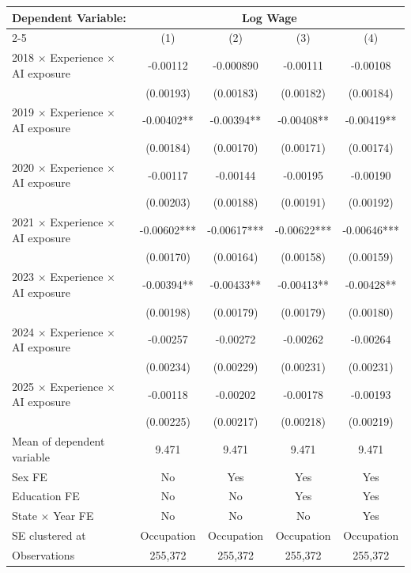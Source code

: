 \def\sym#1{\ifmmode^{#1}\else\(^{#1}\)\fi}
\begin{tabular}{l*{4}{c}}
\toprule
Dependent Variable: & \multicolumn{4}{c}{Log Wage} \\
\cmidrule(lr){2-5}
 & (1) & (2) & (3) & (4) \\
\midrule
2018 $\times$ Experience $\times$ AI exposure&    -0.00112   &   -0.000890   &    -0.00111   &    -0.00108   \\
            &   (0.00193)   &   (0.00183)   &   (0.00182)   &   (0.00184)   \\
2019 $\times$ Experience $\times$ AI exposure&    -0.00402** &    -0.00394** &    -0.00408** &    -0.00419** \\
            &   (0.00184)   &   (0.00170)   &   (0.00171)   &   (0.00174)   \\
2020 $\times$ Experience $\times$ AI exposure&    -0.00117   &    -0.00144   &    -0.00195   &    -0.00190   \\
            &   (0.00203)   &   (0.00188)   &   (0.00191)   &   (0.00192)   \\
2021 $\times$ Experience $\times$ AI exposure&    -0.00602***&    -0.00617***&    -0.00622***&    -0.00646***\\
            &   (0.00170)   &   (0.00164)   &   (0.00158)   &   (0.00159)   \\
2023 $\times$ Experience $\times$ AI exposure&    -0.00394** &    -0.00433** &    -0.00413** &    -0.00428** \\
            &   (0.00198)   &   (0.00179)   &   (0.00179)   &   (0.00180)   \\
2024 $\times$ Experience $\times$ AI exposure&    -0.00257   &    -0.00272   &    -0.00262   &    -0.00264   \\
            &   (0.00234)   &   (0.00229)   &   (0.00231)   &   (0.00231)   \\
2025 $\times$ Experience $\times$ AI exposure&    -0.00118   &    -0.00202   &    -0.00178   &    -0.00193   \\
            &   (0.00225)   &   (0.00217)   &   (0.00218)   &   (0.00219)   \\
\midrule
Mean of dependent variable&       9.471   &       9.471   &       9.471   &       9.471   \\
Sex FE      &          No   &         Yes   &         Yes   &         Yes   \\
Education FE&          No   &          No   &         Yes   &         Yes   \\
State $\times$ Year FE&          No   &          No   &          No   &         Yes   \\
SE clustered at&  Occupation   &  Occupation   &  Occupation   &  Occupation   \\
Observations&     255,372   &     255,372   &     255,372   &     255,372   \\
\bottomrule
\end{tabular}
